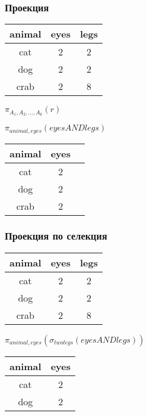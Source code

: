 \documentclass{beamer}
\begin{document}
\begin{frame}[fragile]
\frametitle{Проекция}

\begin{center}
\begin{tabular}{ c | c | c }
  animal  & eyes  & legs \\ \hline  
  cat  & 2  & 2 \\
  dog & 2 & 2 \\
  crab & 2 & 8 \\
\end{tabular} 
\end{center}

\pause

\begin{center}
  $\pi_{A_1,A_2,...,A_k}(r)$
\end{center}

\pause

\begin{center}
  $\pi_{animal,eyes}(eyesANDlegs)$
\end{center}

\begin{center}
\begin{tabular}{ c | c | c }
  animal  & eyes \\ \hline  
  cat  & 2   \\
  dog & 2 \\
  crab & 2 \\
\end{tabular} 
\end{center}


\end{frame}



\begin{frame}[fragile]
\frametitle{Проекция по селекция}

\begin{center}
\begin{tabular}{ c | c | c }
  animal  & eyes  & legs \\ \hline  
  cat  & 2  & 2 \\
  dog & 2 & 2 \\
  crab & 2 & 8 \\
\end{tabular} 
\end{center}

\pause

\begin{center}
  $\pi_{animal,eyes}(\sigma_{twolegs}(eyesANDlegs))$
\end{center}

\pause


\begin{center}
\begin{tabular}{ c | c }
  animal  & eyes \\ \hline  
  cat  & 2   \\
  dog & 2 \\
\end{tabular} 
\end{center}


\end{frame}
\end{document}
